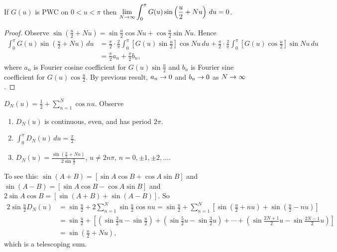 \documentclass[]{article}
\begin{document}
\begin{lemma}
	 If $G(u)$ is PWC on $0<u<\pi$ then $ \displaystyle \lim_{N\rightarrow\infty} \int_0^\pi G(u) \sin\left(\frac{u}{2} + Nu\right) \, du =0$.
\end{lemma}
\begin{proof}
	Observe $\displaystyle \sin\left(\frac{u}{2}+Nu\right) = \sin{\frac{u}{2}}\cos{Nu}+\cos{\frac{u}{2}}\sin{Nu}$. Hence \begin{align*}\int_0^\pi G(u) \sin \left(\frac{u}{2} + Nu\right) \, du &= \frac{\pi}{2} \cdot \frac{2}{\pi} \int_0^\pi \left[ G(u) \sin{\frac{u}{2}} \right] \cos{Nu} \, du + \frac{\pi}{2} \cdot \frac{2}{\pi} \int_0^\pi \left[ G(u) \cos{\frac{u}{2}}\right] \sin{Nu} \, du \\ &=\frac{\pi}{2} a_n + \frac{\pi}{2} b_n, \end{align*} where $a_n$ is Fourier cosine coefficient for $G(u)\sin{\frac{u}{2}}$ and $b_n$ is Fourier sine coefficient for $G(u)\cos{\frac{u}{2}}$. By previous result, $a_n\rightarrow 0$ and $b_n\rightarrow 0$ as $N\rightarrow\infty$.
\end{proof}
\begin{definition}
	 $\displaystyle D_N(u) = \frac{1}{2} + \sum_{n=1}^N \cos{nu}$. Observe 
	\begin{enumerate}
		\item $D_N(u)$ is continuous, even, and has period $2\pi$.
		\item $\int_0^\pi D_N(u) \, du = \frac{\pi}{2}$.
		\item $\displaystyle D_N(u) = \frac{\sin{\left(\frac{u}{2} + Nu\right)}}{2\sin{\frac{u}{2}}}$, $u\neq 2n\pi$, $n=0,\pm1,\pm2,\dots$.
	\end{enumerate}
	To see this: $\sin{(A+B)} = [\sin{A} \cos B + \cos A \sin B]$ and $\sin(A-B) = [\sin A \cos B - \cos A \sin B] $ 
	and $2\sin A \cos B = [\sin(A+B) + \sin(A-B)]$. So \begin{align*}
	2\sin{\frac{u}{2}} D_N(u) &= \sin{\frac{u}{2}} + 2 \sum_{n=1}^N \sin{\frac{u}{2}}\cos{nu} = \sin{\frac{u}{2}} + \sum_{n=1}^N \left[ \sin{\left(\frac{u}{2} + nu \right)} + \sin{\left(\frac{u}{2} - nu \right)} \right] \\ &= \sin{\frac{u}{2}} + \left[ \left( \sin{\frac{3}{2}u} - \sin{\frac{u}{2}} \right) + \left(\sin{\frac{5}{2}u}-\sin{\frac{3}{2}u} \right) + \cdots + \left( \sin{\frac{2N+1}{2}u} - \sin{\frac{2N-1}{2}u} \right) \right] \\ & = \sin{\left(\frac{u}{2}+Nu\right) },\end{align*}
	which is a telescoping sum.
\end{definition}
\end{document}
